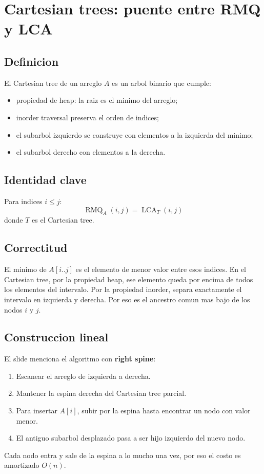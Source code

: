 \documentclass[10pt]{article}
\newcommand{\bigO}{O}
\newcommand{\RMQ}{\operatorname{RMQ}}
\newcommand{\LCA}{\operatorname{LCA}}
\begin{document}
\newpage
\section{Cartesian trees: puente entre RMQ y LCA}

\subsection{Definicion}
El Cartesian tree de un arreglo $A$ es un arbol binario que cumple:
\begin{itemize}[leftmargin=*]
\item propiedad de heap: la raiz es el minimo del arreglo;
\item inorder traversal preserva el orden de indices;
\item el subarbol izquierdo se construye con elementos a la izquierda del minimo;
\item el subarbol derecho con elementos a la derecha.
\end{itemize}

\subsection{Identidad clave}
Para indices $i\le j$:
\[
\RMQ_A(i,j) = \LCA_T(i,j)
\]
donde $T$ es el Cartesian tree.

\subsection{Correctitud}
El minimo de $A[i..j]$ es el elemento de menor valor entre esos indices. En el
Cartesian tree, por la propiedad heap, ese elemento queda por encima de todos
los elementos del intervalo. Por la propiedad inorder, separa exactamente el
intervalo en izquierda y derecha. Por eso es el ancestro comun mas bajo de los
nodos $i$ y $j$.

\subsection{Construccion lineal}
El slide menciona el algoritmo con \textbf{right spine}:
\begin{enumerate}[leftmargin=*]
\item Escanear el arreglo de izquierda a derecha.
\item Mantener la espina derecha del Cartesian tree parcial.
\item Para insertar $A[i]$, subir por la espina hasta encontrar un nodo con valor menor.
\item El antiguo subarbol desplazado pasa a ser hijo izquierdo del nuevo nodo.
\end{enumerate}
Cada nodo entra y sale de la espina a lo mucho una vez, por eso el costo es
amortizado $\bigO(n)$.
\end{document}
